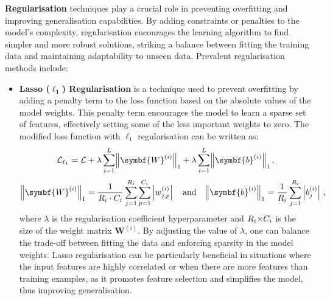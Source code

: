 \textbf{Regularisation} techniques play a crucial role in preventing overfitting and improving generalisation capabilities. By adding constraints or penalties to the model's complexity, regularisation encourages the learning algorithm to find simpler and more robust solutions, striking a balance between fitting the training data and maintaining adaptability to unseen data. Prevalent regularisation methods include:
\vspace{0.25cm}
\begin{itemize}[leftmargin=1.5em]
    \setlength\itemsep{0.2cm}
    \item \textbf{Lasso ($\symbf{\ell_1}$) Regularisation} is a technique used to prevent overfitting by adding a penalty term to the loss function based on the absolute values of the model weights. This penalty term encourages the model to learn a sparse set of features, effectively setting some of the less important weights to zero. The modified loss function with $\ell_1$ regularisation can be written as:
          \begin{equation}
              \mathcal{L}_{\ell_1} = \mathcal{L} + \lambda\sum\limits_{i=1}^{L}\norm*{\symbf{W}^{(i)}}_1 + \lambda\sum\limits_{i=1}^{L}\norm*{\symbf{b}^{(i)}}_1\,,
          \end{equation}
          \begin{equation}
              \norm*{\symbf{W}^{(i)}}_1 = \dfrac{1}{R_i \cdot C_i} \sum\limits_{j=1}^{R_i} \sum\limits_{p=1}^{C_i} \left| w_{j,p}^{(i)} \right|
              \quad \text{and} \quad
              \norm*{\symbf{b}^{(i)}}_1 = \dfrac{1}{R_i} \sum\limits_{j=1}^{R_i} \left| b_{j}^{(i)} \right|\,,
          \end{equation}
          where $\lambda$ is the regularisation coefficient hyperparameter and $R_i {\times} C_i$ is the size of the weight matrix $\symbf{W}^{(i)}$. By adjusting the value of $\lambda$, one can balance the trade-off between fitting the data and enforcing sparsity in the model weights. Lasso regularisation can be particularly beneficial in situations where the input features are highly correlated or when there are more features than training examples, as it promotes feature selection and simplifies the model, thus improving generalisation.


\end{itemize}
